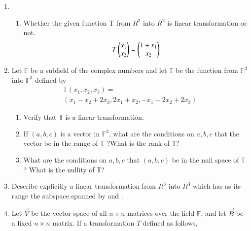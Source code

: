 \renewcommand{\theequation}{\theenumi}
\renewcommand{\thefigure}{\theenumi}
\begin{enumerate}[label=\thesubsection.\arabic*.,ref=\thesubsection.\theenumi]
%
\item 
\begin{enumerate}
\item Whether the given function T from $R^2$ into $R^2$ is linear transformation or not.
\begin{align}
    T\begin{pmatrix}x_1\\x_2\end{pmatrix}=\begin{pmatrix}1+x_1\\x_2\end{pmatrix}
\label{eq:solutions/3/1/1/a/1}
\end{align}
\solution


\end{enumerate}
\item Let $\mathbb{F}$ be a subfield of the complex numbers and let $\mathbb{T}$ be the function from $\mathbb{F}^3$ into $\mathbb{F}^3$ defined by 
\begin{align}
    \mathbb{T}(x_1,x_2,x_3)=\\(x_1-x_2+2x_3,2x_1+x_2,-x_1-2x_2+2x_3)
\end{align}
\begin{enumerate}
\item  Verify that $\mathbb{T}$ is a linear transformation.\\
\item  If $(a,b,c)$ is a vector in  $\mathbb{F}^3$, what are the conditions on $a,b,c$ that the vector be in the range of  $\mathbb{T}$ ?What is the rank of  $\mathbb{T}$?\\
\item  What are the conditions on $a,b,c$ that $(a,b,c)$ be in the null space of  
$\mathbb{T}$? What is the nullity of  $\mathbb{T}$?
\end{enumerate}
\solution

\item Describe explicitly a linear transformation from $R^{3}$ into $R^{3}$ which has as its range the subspace spanned by  and .  
%
\\
\solution

\item Let $\vec{V}$ be the vector space of all $n \times n$ matrices over the field $\mathbb{F}$, and let $\vec{B}$ be a fixed $n \times n$ matrix. If a transformation $T$ defined as follows,
\begin{align*}

\end{align*}
\end{enumerate}
